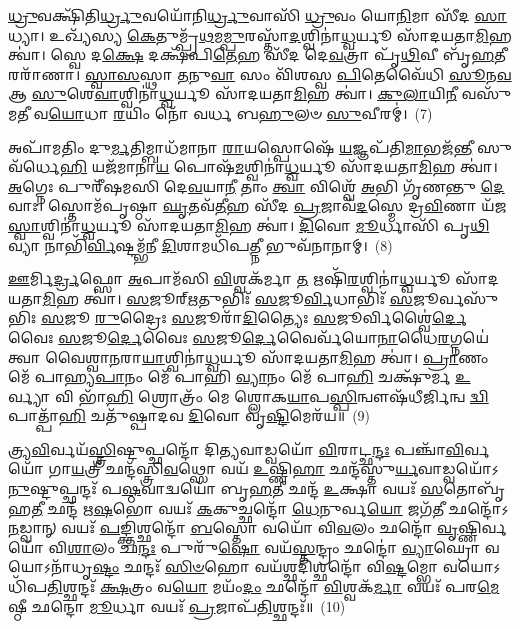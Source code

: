 \-\ul{𑌧𑍍𑌰𑍁}\-𑌵𑌕𑍍𑌷𑌿᳴𑌤𑌿\-\ul{𑌰𑍍𑌧𑍍𑌰𑍁}\-𑌵𑌯𑍋᳴𑌨𑌿\-\ul{𑌰𑍍𑌧𑍍𑌰𑍁}\-𑌵𑌾𑌸𑌿᳴ \ul{𑌧𑍍𑌰𑍁}\-𑌵𑌂 𑌯𑍋\-\ul{𑌨𑌿}\-𑌮𑌾 𑌸𑍀᳴𑌦 \ul{𑌸𑌾}\-𑌧𑍍𑌯𑌾। 𑌉𑌖𑍍𑌯᳴𑌸𑍍𑌯 \ul{𑌕𑍇}\-𑌤𑍁𑌮𑍍𑌪𑍍𑌰᳴\-\ul{𑌥}\-𑌮\-\ul{𑌮𑍍𑌪𑍁}\-𑌰𑌸𑍍𑌤𑌾᳴\-\ul{𑌦}\-𑌶𑍍𑌵𑌿𑌨𑌾॑\-\ul{𑌧𑍍𑌵}\-𑌰𑍍𑌯𑍂 𑌸𑌾᳴𑌦𑌯𑌤𑌾\-\ul{𑌮𑌿}\-𑌹 𑌤𑍍𑌵𑌾॑। 𑌸𑍍𑌵𑍇 𑌦\-\ul{𑌕𑍍𑌷𑍇} 𑌦𑌕𑍍𑌷᳴𑌪𑌿\-\ul{𑌤𑍇}\-𑌹 𑌸𑍀᳴𑌦 𑌦𑍇\-\ul{𑌵}\-𑌤𑍍𑌰𑌾 𑌪𑍃᳴\-\ul{𑌥𑌿}\-𑌵𑍀 𑌬𑍃᳴\-\ul{𑌹}\-𑌤𑍀 𑌰𑌰𑌾᳴𑌣𑌾। \ul{𑌸𑍍𑌵𑌾}\-\-\ul{𑌸}\-𑌸𑍍𑌥𑌾 \ul{𑌤}\-𑌨𑍁\-\ul{𑌵𑌾} 𑌸𑌂 𑌵𑌿᳴𑌶𑌸𑍍𑌵 \ul{𑌪𑌿}\-𑌤𑍇𑌵𑍈᳴𑌧𑌿 \ul{𑌸𑍂}\-𑌨\-\ul{𑌵} 𑌆 \ul{𑌸𑍁}\-𑌶𑍇\-\ul{𑌵𑌾}\-𑌶𑍍𑌵𑌿𑌨𑌾॑\-\ul{𑌧𑍍𑌵}\-𑌰𑍍𑌯𑍂 𑌸𑌾᳴𑌦𑌯𑌤𑌾\-\ul{𑌮𑌿}\-𑌹 𑌤𑍍𑌵𑌾॑। \ul{𑌕𑍁}\-\-\ul{𑌲𑌾}\-𑌯𑌿\-\ul{𑌨𑍀} 𑌵𑌸𑍁᳴𑌮𑌤𑍀 𑌵\-\ul{𑌯𑍋}\-𑌧𑌾 \ul{𑌰}\-𑌯𑌿𑌂 𑌨𑍋᳴ 𑌵𑌰𑍍𑌧 𑌬\-\ul{𑌹𑍁}\-𑌲𑍞 \ul{𑌸𑍁}\-𑌵𑍀𑌰𑌮𑍍॑।~(7)

𑌅𑌪𑌾᳴𑌮𑌤𑌿𑌂 𑌦𑍁\-\ul{𑌰𑍍𑌮}\-𑌤𑌿𑌮𑍍𑌬𑌾𑌧᳴𑌮𑌾𑌨𑌾 \ul{𑌰𑌾}\-𑌯𑌸𑍍𑌪𑍋𑌷𑍇᳴ \ul{𑌯}\-𑌜𑍍𑌞𑌪᳴𑌤𑌿\-\ul{𑌮𑌾}\-𑌭𑌜᳴\-\ul{𑌨𑍍𑌤𑍀} 𑌸𑍁𑌵᳴𑌰𑍍𑌧𑍇\-\ul{𑌹𑌿} 𑌯𑌜᳴𑌮𑌾𑌨𑌾\-\ul{𑌯} 𑌪𑍋𑌷᳴\-\ul{𑌮}\-𑌶𑍍𑌵𑌿𑌨𑌾॑\-\ul{𑌧𑍍𑌵}\-𑌰𑍍𑌯𑍂 𑌸𑌾᳴𑌦𑌯𑌤𑌾\-\ul{𑌮𑌿}\-𑌹 𑌤𑍍𑌵𑌾॑। \ul{𑌅}\-𑌗𑍍𑌨𑍇𑌃 𑌪𑍁𑌰𑍀᳴𑌷𑌮𑌸𑌿 𑌦𑍇\-\ul{𑌵}\-𑌯𑌾\-\ul{𑌨𑍀} 𑌤𑌾𑌂 \ul{𑌤𑍍𑌵𑌾} 𑌵𑌿𑌶𑍍𑌵𑍇᳴ \ul{𑌅}\-𑌭𑌿 𑌗𑍃᳴𑌣𑌨𑍍𑌤𑍁 \ul{𑌦𑍇}\-𑌵𑌾𑌃। 𑌸𑍍𑌤𑍋𑌮᳴𑌪𑍃𑌷𑍍𑌠𑌾 \ul{𑌘𑍃}\-𑌤𑌵᳴\-\ul{𑌤𑍀}\-𑌹 𑌸𑍀᳴𑌦 \ul{𑌪𑍍𑌰}\-𑌜𑌾𑌵᳴\-\ul{𑌦}\-𑌸𑍍𑌮𑍇 𑌦𑍍𑌰\-\ul{𑌵𑌿}\-𑌣𑌾 𑌯᳴𑌜\-\ul{𑌸𑍍𑌵𑌾}\-𑌶𑍍𑌵𑌿𑌨𑌾॑\-\ul{𑌧𑍍𑌵}\-𑌰𑍍𑌯𑍂 𑌸𑌾᳴𑌦𑌯𑌤𑌾\-\ul{𑌮𑌿}\-𑌹 𑌤𑍍𑌵𑌾॑। \ul{𑌦𑌿}\-𑌵𑍋 \ul{𑌮𑍂}\-𑌰𑍍𑌧𑌾𑌸𑌿᳴ 𑌪𑍃\-\ul{𑌥𑌿}\-𑌵𑍍𑌯𑌾 𑌨𑌾𑌭𑌿᳴\-\ul{𑌰𑍍𑌵𑌿}\-𑌷𑍍𑌟𑌮𑍍𑌭᳴𑌨𑍀 \ul{𑌦𑌿}\-𑌶𑌾𑌮𑌧𑌿᳴𑌪\-\ul{𑌤𑍍𑌨𑍀} 𑌭𑍁𑌵᳴𑌨𑌾𑌨𑌾𑌮𑍍।~(8)

\-\ul{𑌊}\-𑌰𑍍𑌮𑌿\-\ul{𑌰𑍍𑌦𑍍𑌰}\-𑌫𑍍𑌸𑍋 \ul{𑌅}\-𑌪𑌾𑌮᳴𑌸𑌿 \ul{𑌵𑌿}\-𑌶𑍍𑌵𑌕᳴𑌰𑍍𑌮𑌾 \ul{𑌤} 𑌋𑌷𑌿᳴\-\ul{𑌰}\-𑌶𑍍𑌵𑌿𑌨𑌾॑\-\ul{𑌧𑍍𑌵}\-𑌰𑍍𑌯𑍂 𑌸𑌾᳴𑌦𑌯𑌤𑌾\-\ul{𑌮𑌿}\-𑌹 𑌤𑍍𑌵𑌾॑। \ul{𑌸}\-𑌜𑍂𑌰𑍍\mbox{}\-\ul{𑌋}\-𑌤𑍁𑌭𑌿𑌃᳴ \ul{𑌸}\-𑌜𑍂\-\ul{𑌰𑍍𑌵𑌿}\-𑌧𑌾𑌭𑌿𑌃᳴ \ul{𑌸}\-𑌜𑍂𑌰𑍍𑌵𑌸𑍁᳴𑌭𑌿𑌃 \ul{𑌸}\-𑌜𑍂 \ul{𑌰𑍁}\-𑌦𑍍𑌰𑍈𑌃 \ul{𑌸}\-𑌜𑍂𑌰𑌾᳴\-\ul{𑌦𑌿}\-𑌤𑍍𑌯𑍈𑌃 \ul{𑌸}\-𑌜𑍂𑌰𑍍𑌵𑌿𑌶𑍍𑌵𑍈॑\-\ul{𑌰𑍍𑌦𑍇}\-𑌵𑍈𑌃 \ul{𑌸}\-𑌜𑍂\-\ul{𑌰𑍍𑌦𑍇}\-𑌵𑍈𑌃 \ul{𑌸}\-𑌜𑍂\-\ul{𑌰𑍍𑌦𑍇}\-𑌵𑍈𑌰𑍍𑌵᳴𑌯𑍋\-\ul{𑌨𑌾}\-𑌧𑍈\-\ul{𑌰}\-𑌗𑍍𑌨𑌯𑍇॑ 𑌤𑍍𑌵𑌾 𑌵𑍈𑌶𑍍𑌵𑌾\-\ul{𑌨}\-𑌰𑌾\-\ul{𑌯𑌾}\-𑌶𑍍𑌵𑌿𑌨𑌾॑\-\ul{𑌧𑍍𑌵}\-𑌰𑍍𑌯𑍂 𑌸𑌾᳴𑌦𑌯𑌤𑌾\-\ul{𑌮𑌿}\-𑌹 𑌤𑍍𑌵𑌾॑। \ul{𑌪𑍍𑌰𑌾}\-𑌣𑌂 𑌮𑍇᳴ 𑌪𑌾𑌹𑍍𑌯\-\ul{𑌪𑌾}\-𑌨𑌂 𑌮𑍇᳴ 𑌪𑌾𑌹𑌿 \ul{𑌵𑍍𑌯𑌾}\-𑌨𑌂 𑌮𑍇᳴ 𑌪𑌾\-\ul{𑌹𑌿} 𑌚𑌕𑍍𑌷𑍁᳴𑌰𑍍𑌮 \ul{𑌉}\-𑌰𑍍𑌵𑍍𑌯𑌾 𑌵𑌿 𑌭𑌾᳴\-\ul{𑌹𑌿} 𑌶𑍍𑌰𑍋𑌤𑍍𑌰𑌂᳴ 𑌮𑍇 𑌶𑍍𑌲𑍋𑌕\-\ul{𑌯𑌾}\-𑌪\-\ul{𑌸𑍍𑌪𑌿}\-𑌨𑍍𑌵𑍗𑌷᳴𑌧𑍀𑌰𑍍𑌜𑌿𑌨𑍍𑌵 \ul{𑌦𑍍𑌵𑌿}\-𑌪𑌾𑌤𑍍𑌪𑌾᳴\-\ul{𑌹𑌿} 𑌚𑌤𑍁᳴𑌷𑍍𑌪𑌾𑌦𑌵 \ul{𑌦𑌿}\-𑌵𑍋 𑌵𑍃\-\ul{𑌷𑍍𑌟𑌿}\-𑌮𑍇𑌰᳴𑌯॥~(9)

{\anuvakamend[{\-\ul{𑌸𑍁}\-𑌵𑍀\-\ul{𑌰𑌂} 𑌭𑍁𑌵᳴𑌨𑌾𑌨𑌾\-\ul{𑌮𑍁}\-𑌰𑍍𑌵𑍍𑌯𑌾 \ul{𑌸}\-𑌪𑍍𑌤𑌦᳴𑌶 𑌚}]}%

𑌤𑍍𑌰𑍍𑌯\-\ul{𑌵𑌿}\-𑌰𑍍𑌵𑌯᳴\-\ul{𑌸𑍍𑌤𑍍𑌰𑌿}\-𑌷𑍍𑌟𑍁𑌪𑍍𑌛𑌨𑍍𑌦𑍋᳴ 𑌦𑌿\-\ul{𑌤𑍍𑌯}\-𑌵𑌾𑌡𑍍𑌵𑌯𑍋᳴ \ul{𑌵𑌿}\-𑌰𑌾𑌟𑍍𑌛\-\ul{𑌨𑍍𑌦𑌃} 𑌪𑌞𑍍𑌚𑌾᳴\-\ul{𑌵𑌿}\-𑌰𑍍𑌵𑌯𑍋᳴ 𑌗𑌾\-\ul{𑌯}\-𑌤𑍍𑌰𑍀 𑌛𑌨𑍍𑌦᳴𑌸𑍍𑌤𑍍𑌰𑌿\-\ul{𑌵}\-𑌥𑍍𑌸𑍋 𑌵𑌯᳴ \ul{𑌉}\-𑌷𑍍𑌣𑌿\-\ul{𑌹𑌾} 𑌛𑌨𑍍𑌦᳴𑌸𑍍𑌤𑍁\-\ul{𑌰𑍍𑌯}\-𑌵𑌾𑌡𑍍𑌵𑌯𑍋᳴\-𑌽\-\-\ul{𑌨𑍁}\-𑌷𑍍𑌟𑍁𑌪𑍍𑌛𑌨𑍍𑌦𑌃᳴ 𑌪\-\ul{𑌷𑍍𑌠}\-𑌵𑌾𑌦𑍍𑌵𑌯𑍋᳴ 𑌬𑍃\-\ul{𑌹}\-𑌤𑍀 𑌛𑌨𑍍𑌦᳴ \ul{𑌉}\-𑌕𑍍𑌷𑌾 𑌵𑌯𑌃᳴ \ul{𑌸}\-𑌤𑍋𑌬𑍃᳴𑌹\-\ul{𑌤𑍀} 𑌛𑌨𑍍𑌦᳴ 𑌋\-\ul{𑌷}\-𑌭𑍋 𑌵𑌯𑌃᳴ \ul{𑌕}\-𑌕𑍁𑌚𑍍𑌛𑌨𑍍𑌦𑍋᳴ \ul{𑌧𑍇}\-𑌨𑍁𑌰𑍍𑌵\-\ul{𑌯𑍋} 𑌜𑌗᳴\-\ul{𑌤𑍀} 𑌛𑌨𑍍𑌦𑍋᳴\-𑌽\-\-\ul{𑌨}\-𑌡𑍍𑌵𑌾𑌨𑍍 𑌵𑌯𑌃᳴ \ul{𑌪}\-𑌙𑍍𑌕𑍍𑌤𑌿𑌶𑍍𑌛𑌨𑍍𑌦𑍋᳴ \ul{𑌬}\-𑌸𑍍𑌤𑍋 𑌵𑌯𑍋᳴ 𑌵𑌿\-\ul{𑌵}\-𑌲𑌂 𑌛𑌨𑍍𑌦𑍋᳴ \ul{𑌵𑍃}\-𑌷𑍍𑌣𑌿𑌰𑍍𑌵𑌯𑍋᳴ 𑌵𑌿\-\ul{𑌶𑌾}\-𑌲𑌂 𑌛\-\ul{𑌨𑍍𑌦𑌃} 𑌪𑍁𑌰𑍁᳴\-\ul{𑌷𑍋} 𑌵𑌯᳴\-\ul{𑌸𑍍𑌤}\-𑌨𑍍𑌦𑍍𑌰𑌂 𑌛𑌨𑍍𑌦𑍋॑ \ul{𑌵𑍍𑌯𑌾}\-𑌘𑍍𑌰𑍋 𑌵𑌯𑍋\-𑌽\-𑌨𑌾᳴𑌧𑍃\-\ul{𑌷𑍍𑌟𑌂} 𑌛𑌨𑍍𑌦𑌃᳴ \ul{𑌸𑌿}\-\-\ul{𑍞}\-𑌹𑍋 𑌵𑌯᳴\-\ul{𑌶𑍍𑌛}\-𑌦𑌿𑌶𑍍𑌛𑌨𑍍𑌦𑍋᳴ 𑌵𑌿\-\ul{𑌷𑍍𑌟}\-𑌮𑍍𑌭𑍋 𑌵𑌯𑍋\-𑌽𑌧𑌿᳴𑌪\-\ul{𑌤𑌿}\-𑌶𑍍𑌛𑌨𑍍𑌦𑌃᳴ \ul{𑌕𑍍𑌷}\-𑌤𑍍𑌰𑌂 𑌵\-\ul{𑌯𑍋} 𑌮𑌯𑌂᳴\-\ul{𑌦𑌂} 𑌛𑌨𑍍𑌦𑍋᳴ \ul{𑌵𑌿}\-𑌶𑍍𑌵𑌕᳴\-\ul{𑌰𑍍𑌮𑌾} 𑌵𑌯𑌃᳴ 𑌪𑌰\-\ul{𑌮𑍇}\-𑌷𑍍𑌠𑍀 𑌛𑌨𑍍𑌦𑍋 \ul{𑌮𑍂}\-𑌰𑍍𑌧𑌾 𑌵𑌯𑌃᳴ \ul{𑌪𑍍𑌰}\-𑌜𑌾𑌪᳴\-\ul{𑌤𑌿}\-𑌶𑍍𑌛𑌨𑍍𑌦𑌃᳴॥~(10)

